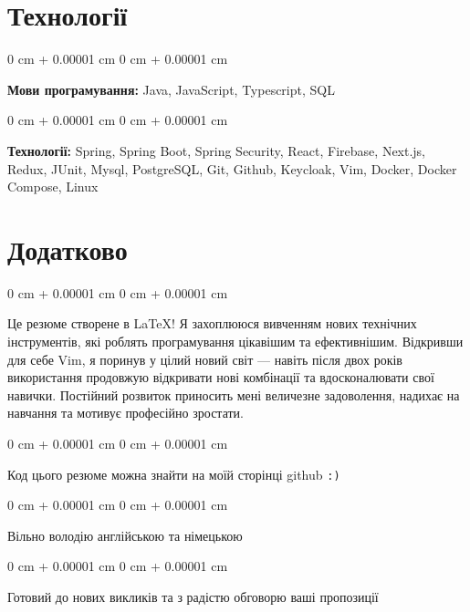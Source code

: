 \documentclass[10pt, letterpaper]{article}
\newenvironment{onecolentry}{
    \begin{adjustwidth}{
        0 cm + 0.00001 cm
    }{
        0 cm + 0.00001 cm
    }
}{
    \end{adjustwidth}
} %
\begin{document}
    \section{Технології}
        \begin{onecolentry}
            \textbf{Мови програмування:} Java, JavaScript, Typescript, SQL
        \end{onecolentry}

        \vspace{0.2 cm}

        \begin{onecolentry}
            \textbf{Технології:} Spring, Spring Boot, Spring Security, React, Firebase, Next.js, Redux, JUnit, Mysql, PostgreSQL, Git, Github, Keycloak, Vim, Docker, Docker Compose, Linux
        \end{onecolentry}

    \section{Додатково}

    \begin{onecolentry}
Це резюме створене в \LaTeX{}! Я захоплююся вивченням нових технічних інструментів, які роблять програмування цікавішим та ефективнішим. Відкривши для себе Vim, я поринув у цілий новий світ — навіть після двох років використання продовжую відкривати нові комбінації та вдосконалювати свої навички. Постійний розвиток приносить мені величезне задоволення, надихає на навчання та мотивує професійно зростати.
    \end{onecolentry}

    \vspace{0.1 cm}
    \begin{onecolentry}
        Код цього резюме можна знайти на моїй сторінці github \texttt{:)}
    \end{onecolentry}

    \vspace{0.1 cm}
    \begin{onecolentry}
    Вільно володію англійською та німецькою
    \end{onecolentry}

    \vspace{0.1 cm}
    \begin{onecolentry}
    Готовий до нових викликів та з радістю обговорю ваші пропозиції
    \end{onecolentry}
\end{document}
